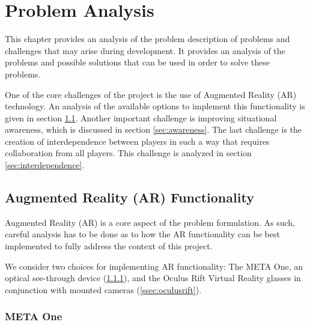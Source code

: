 \chapter{Problem Analysis} \label{cha:analysis}
	This chapter provides an analysis of the problem description of problems
	and challenges that may arise during development. It provides an analysis
	of the problems and possible solutions that can be used in order to
	solve these problems.

	One of the core challenges of the project is the use of Augmented Reality
	(AR) technology. An analysis of the available options to implement this
	functionality is given in section \ref{sec:ar}. Another important challenge
	is improving situational awareness, which is discussed in section
	\ref{sec:awareness}. The last challenge is the creation of interdependence
	between players in such a way that requires collaboration from all players.
	This challenge is analyzed in section \ref{sec:interdependence}.

	\section{Augmented Reality (AR) Functionality} \label{sec:ar}
		Augmented Reality (AR) is a core aspect of the problem formulation.
		As such, careful analysis has to be done as to how the AR functionality
		can be best implemented to fully address the context of this project.

		We consider two choices for implementing AR functionality: The META One,
		an optical see-through device (\ref{ssec:metaone}), and the Oculus Rift
		Virtual Reality glasses in conjunction with mounted cameras
		(\ref{ssec:oculusrift}).

		\subsection{META One} \label{ssec:metaone}


